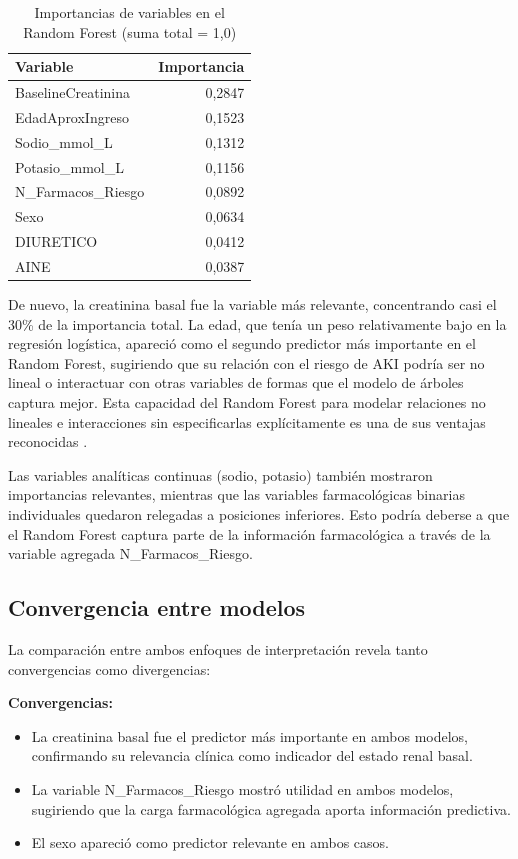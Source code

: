 \documentclass[12pt, a4paper, oneside]{report}
\begin{document}
\begin{table}[h]
\centering
\begin{tabular}{lr}
\hline
\textbf{Variable} & \textbf{Importancia} \\
\hline
BaselineCreatinina & 0,2847 \\
EdadAproxIngreso & 0,1523 \\
Sodio\_mmol\_L & 0,1312 \\
Potasio\_mmol\_L & 0,1156 \\
N\_Farmacos\_Riesgo & 0,0892 \\
Sexo & 0,0634 \\
DIURETICO & 0,0412 \\
AINE & 0,0387 \\
\hline
\end{tabular}
\caption{Importancias de variables en el Random Forest (suma total = 1,0)}
\label{tab:imp_rf}
\end{table}

De nuevo, la creatinina basal fue la variable más relevante, concentrando casi el 30\% de la importancia total. La edad, que tenía un peso relativamente bajo en la regresión logística, apareció como el segundo predictor más importante en el Random Forest, sugiriendo que su relación con el riesgo de AKI podría ser no lineal o interactuar con otras variables de formas que el modelo de árboles captura mejor. Esta capacidad del Random Forest para modelar relaciones no lineales e interacciones sin especificarlas explícitamente es una de sus ventajas reconocidas \cite{couronne2018random}.

Las variables analíticas continuas (sodio, potasio) también mostraron importancias relevantes, mientras que las variables farmacológicas binarias individuales quedaron relegadas a posiciones inferiores. Esto podría deberse a que el Random Forest captura parte de la información farmacológica a través de la variable agregada N\_Farmacos\_Riesgo.

\subsection{Convergencia entre modelos}

La comparación entre ambos enfoques de interpretación revela tanto convergencias como divergencias:

\textbf{Convergencias:}
\begin{itemize}
    \item La creatinina basal fue el predictor más importante en ambos modelos, confirmando su relevancia clínica como indicador del estado renal basal.
    \item La variable N\_Farmacos\_Riesgo mostró utilidad en ambos modelos, sugiriendo que la carga farmacológica agregada aporta información predictiva.
    \item El sexo apareció como predictor relevante en ambos casos.
\end{itemize}
\end{document}
